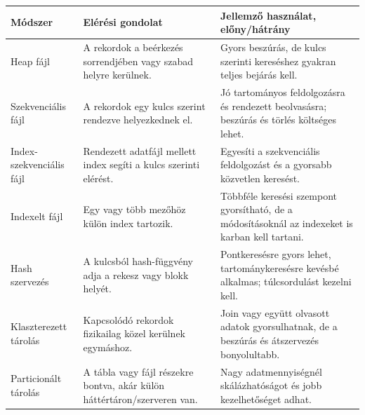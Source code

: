 \begin{tabularx}{\textwidth}{L{28mm}L{32mm}X}
\toprule
\textbf{Módszer} & \textbf{Elérési gondolat} & \textbf{Jellemző használat, előny/hátrány} \\
\midrule
Heap fájl & A rekordok a beérkezés sorrendjében vagy szabad helyre kerülnek. & Gyors beszúrás, de kulcs szerinti kereséshez gyakran teljes bejárás kell. \\
Szekvenciális fájl & A rekordok egy kulcs szerint rendezve helyezkednek el. & Jó tartományos feldolgozásra és rendezett beolvasásra; beszúrás és törlés költséges lehet. \\
Index-szekvenciális fájl & Rendezett adatfájl mellett index segíti a kulcs szerinti elérést. & Egyesíti a szekvenciális feldolgozást és a gyorsabb közvetlen keresést. \\
Indexelt fájl & Egy vagy több mezőhöz külön index tartozik. & Többféle keresési szempont gyorsítható, de a módosításoknál az indexeket is karban kell tartani. \\
Hash szervezés & A kulcsból hash-függvény adja a rekesz vagy blokk helyét. & Pontkeresésre gyors lehet, tartománykeresésre kevésbé alkalmas; túlcsordulást kezelni kell. \\
Klaszterezett tárolás & Kapcsolódó rekordok fizikailag közel kerülnek egymáshoz. & Join vagy együtt olvasott adatok gyorsulhatnak, de a beszúrás és átszervezés bonyolultabb. \\
Particionált tárolás & A tábla vagy fájl részekre bontva, akár külön háttértáron/szerveren van. & Nagy adatmennyiségnél skálázhatóságot és jobb kezelhetőséget adhat. \\
\bottomrule
\end{tabularx}
